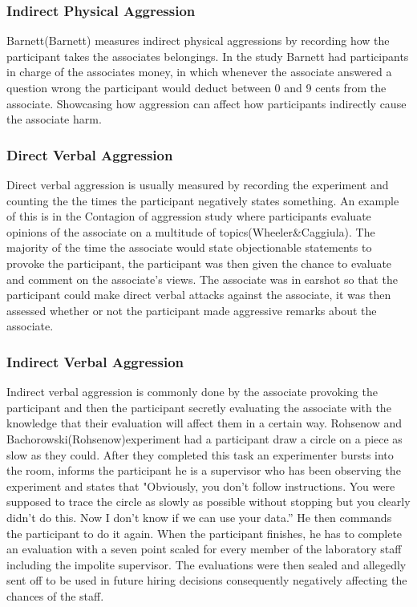 \documentclass[journal]{IEEEtran}
\begin{document}
    \subsubsection{Indirect Physical Aggression}
        Barnett(Barnett) measures indirect physical aggressions by recording how the participant takes the associates belongings. In the study Barnett had participants in charge of the associates money, in which whenever the associate answered a question wrong the participant would deduct between 0 and 9 cents from the associate. Showcasing how aggression can affect how participants indirectly cause the associate harm.

    \subsubsection{Direct Verbal Aggression}
        Direct verbal aggression is usually measured by recording the experiment and counting the the times the participant negatively states something. An example of this is in the Contagion of aggression study where participants evaluate opinions of the associate on a multitude of topics(Wheeler&Caggiula). The majority of the time the associate would state objectionable statements to provoke the participant, the participant was then given the chance to evaluate and comment on the associate's views. The associate was in earshot so that the participant could make direct verbal attacks against the associate, it was then assessed whether or not the participant made aggressive remarks about the associate.

    \subsubsection{Indirect Verbal Aggression}
        Indirect verbal aggression is commonly done by the associate provoking the participant and then the participant secretly evaluating the associate with the knowledge that their evaluation will affect them in a certain way. Rohsenow and Bachorowski(Rohsenow)experiment had a participant draw a circle on a piece as slow as they could. After they completed this task an experimenter bursts into the room, informs the participant he is a supervisor who has been observing the experiment and states that "Obviously, you don't follow instructions. You were supposed to trace the circle as slowly as possible without stopping but you clearly didn't do this. Now I don't know if we can use your data.” He then commands the participant to do it again. When the participant finishes, he has to complete an evaluation with a seven point scaled for every member of the laboratory staff including the impolite supervisor. The evaluations were then sealed and allegedly sent off to be used in future hiring decisions consequently negatively affecting the chances of the staff.
\end{document}
